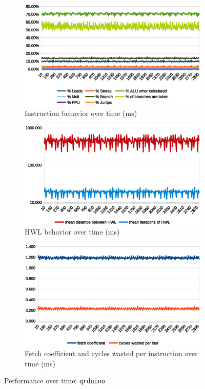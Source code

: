 \documentclass[../bachelor_paper.tex]{subfiles}
\begin{document}
\begin{figure}
    \begin{subfigure}{0.45\textwidth}
        \includegraphics[width=\textwidth]{img/graph/embench/qrduino_inst.eps}
        \caption{Instruction behavior over time (ms)}
    \end{subfigure}
    \begin{subfigure}{0.45\textwidth}
        \includegraphics[width=\textwidth]{img/graph/embench/qrduino_hwl.eps}
        \caption{\ac{HWL} behavior over time (ms)}
    \end{subfigure}
    \begin{subfigure}{0.45\textwidth}
        \includegraphics[width=\textwidth]{img/graph/embench/qrduino_fetch_waste.eps}
        \caption{Fetch coefficient and cycles wasted per instruction over time (ms)}
    \end{subfigure}
    \caption{Performance over time: \texttt{qrduino}}
\end{figure}
\end{document}
